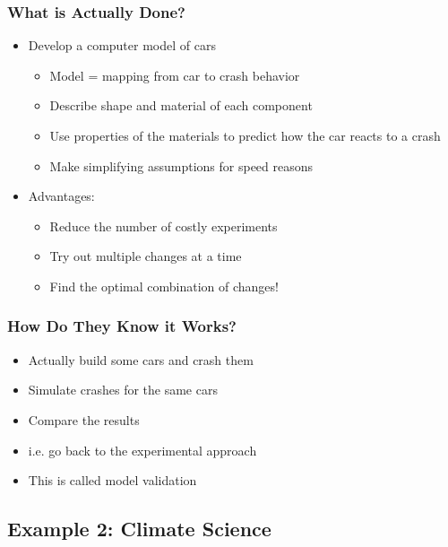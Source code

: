 \documentclass[11pt]{beamer}
\begin{document}
\begin{frame}[c]\frametitle{What is Actually Done?}
    \begin{itemize}
        \item Develop a computer model of cars
        \begin{itemize}
            \item Model = mapping from car to crash behavior
            \item Describe shape and material of each component
            \item Use properties of the materials to predict how the car reacts to a crash
            \item Make simplifying assumptions for speed reasons
        \end{itemize}
        \item Advantages:
        \begin{itemize}
            \item Reduce the number of costly experiments
            \item Try out multiple changes at a time
            \item Find the optimal combination of changes!
        \end{itemize}
    \end{itemize}
\end{frame}


\begin{frame}[c]\frametitle{How Do They Know it Works?}
    \begin{itemize}
        \item Actually build some cars and crash them
        \item Simulate crashes for the same cars
        \item Compare the results
        \item i.e. go back to the experimental approach
        \item This is called model validation
    \end{itemize}
\end{frame}


\subsection{Example 2: Climate Science}
\end{document}
